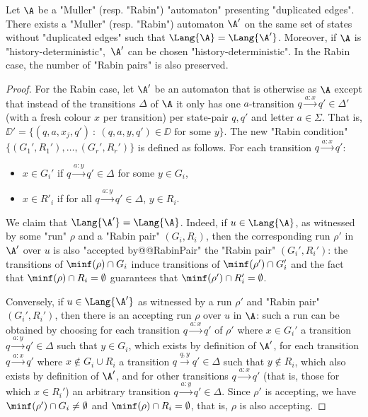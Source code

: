 \documentclass{theoretics}
\begin{document}
\begin{proposition}\label{prop-app:simplification_Rabin}
	Let $\A$ be a "Muller" (resp. "Rabin") "automaton" presenting "duplicated edges". There exists a "Muller" (resp. "Rabin") automaton $\A'$ on the same set of states without "duplicated edges" such that $\Lang{\A} = \Lang{\A'}$. Moreover, if $\A$ is "history-deterministic",~$\A'$ can be chosen "history-deterministic". In the Rabin case, the number of "Rabin pairs" is also preserved. 
\end{proposition}
\begin{proof}
	For the Rabin case, let $\A'$ be an automaton that is otherwise as $\A$ except that instead of the transitions $\Delta$  of $\A$ it only has one $a$-transition $q \xrightarrow{a:x} q'\in \Delta'$ (with a fresh colour $x$ per transition) per state-pair $q,q'$ and letter $a\in \Sigma$. That is, $\DD'=\{(q,a,x_j,q') \: : \: (q,a,y,q')\in \DD \text{ for some } y\}$. The new "Rabin condition" $\{(G_1',R_1'),\ldots, (G_r',R_r')\}$ is defined as follows. For each transition $q\xrightarrow{a:x} q'$:
	\begin{itemize}
		\item $x\in G_i'$ if $q\xrightarrow{a:y} q'\in \Delta$ for some $y\in G_i$, %
		\item  $x\in R'_i$ if for all $q\xrightarrow{a:y} q'\in \Delta$,  $y\in R_i$. %
	\end{itemize}
	
	We claim that $\Lang{\A'}=\Lang{\A}$. Indeed, if $u\in \Lang{\A}$, as witnessed by some "run" $\rho$ and a "Rabin pair" $(G_i,R_i)$, then the corresponding run $\rho'$ in $\A'$ over $u$ is also "accepted by@@RabinPair" the "Rabin pair" $(G_i',R_i')$: the transitions of $\minf(\rho)\cap G_i$ induce transitions of $\minf(\rho')\cap G_i'$ and the fact that $\minf(\rho)\cap R_i=\emptyset$ guarantees that $\minf(\rho')\cap R_i'=\emptyset$.
	
	Conversely, if $u\in \Lang{\A'}$ as witnessed by a run $\rho'$ and "Rabin pair" $(G_i', R_i')$,
	then there is an accepting run $\rho$ over $u$ in $\A$: such a run can be obtained by choosing for each transition $q\xrightarrow{a:x}q'$ of $\rho'$ where $x\in G_i'$ a transition $q\xrightarrow{a:y}q'\in \Delta$ such that $y\in G_i$, which exists by definition of $\A'$, for each transition $q\xrightarrow{a:x}q'$ where $x\notin G_i\cup R_i$ a transition $q\xrightarrow{q,y}q'\in\Delta$ such that $y\notin R_i$, which also exists by definition of $\A'$, and for other transitions $q\xrightarrow{a:x}q'$ (that is, those for which $x\in R_i'$) an arbitrary transition $q\xrightarrow{a:y}q'\in \Delta$. Since $\rho'$ is accepting, we have $\minf(\rho')\cap G_i\neq \emptyset$ and $\minf(\rho)\cap R_i=\emptyset$, that is, $\rho$ is also accepting. 
	

\end{proof}
\end{document}
